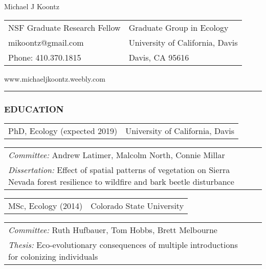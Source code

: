 \documentclass[11pt,english]{article}
\providecommand{\tabularnewline}{\\}
\begin{document}
\begin {center}
{\huge Michael J Koontz}\tabularnewline
\vspace{1em}

\begin{tabular}{>{\raggedright}p{3in}>{\raggedleft}p{3in}}
NSF Graduate Research Fellow & Graduate Group in Ecology\tabularnewline
mikoontz@gmail.com & University of California, Davis\tabularnewline
Phone: 410.370.1815 & Davis, CA 95616\tabularnewline
\end{tabular}
www.michaeljkoontz.weebly.com
\end{center}
\vspace{-1.5em}

\rule[0.5ex]{1\columnwidth}{0.5pt}


\subsubsection*{EDUCATION}
\vspace{-0.5ex}

\begin{tabular}{>{\raggedright}p{4in}>{\raggedleft}p{2in}}
PhD, Ecology (expected 2019) & University of California, Davis\tabularnewline
\end{tabular}

\hspace{1.0em}
\begin{tabular}{p{6in}p{0in}}
\emph{Committee:} Andrew Latimer, Malcolm North, Connie Millar & \tabularnewline
\emph{Dissertation:} Effect of spatial patterns of vegetation on Sierra Nevada forest resilience to wildfire and bark beetle disturbance &
\end{tabular}

\vspace{0.5ex}

\begin{tabular}{>{\raggedright}p{4in}>{\raggedleft}p{2in}}
MSc, Ecology (2014) & Colorado State University\tabularnewline
\end{tabular}

\hspace{1.0em}
\begin{tabular}{p{6in}p{0in}}
\emph{Committee:} Ruth Hufbauer, Tom Hobbs, Brett Melbourne & \tabularnewline
\emph{Thesis:} Eco-evolutionary consequences of multiple introductions for colonizing individuals &
\end{tabular}
\end{document}
